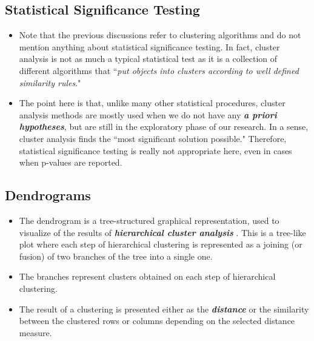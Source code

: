 \documentclass[a4paper,12pt]{article}
\begin{document}
\subsection{Statistical Significance Testing}

\begin{itemize}
\item Note that the previous discussions refer to clustering algorithms and do not mention anything about statistical significance testing. In fact, cluster analysis is not as much a typical statistical test as it is a collection of different algorithms that ``\textit{put objects into clusters according to well defined similarity rules}."
	
\item The point here is that, unlike many other statistical procedures, cluster analysis methods are mostly used when we do not have any \textbf{\textit{a priori hypotheses}}, but are still in the exploratory phase of our research. In a sense, cluster analysis finds the ``most significant solution possible." Therefore, statistical significance testing is really not appropriate here, even in cases when p-values are reported.
\end{itemize}


\subsection{Dendrograms}
\begin{itemize}
	
\item The dendrogram is a tree-structured graphical representation, used to visualize of the results of \textbf{\textit{hierarchical cluster analysis}} . This is a tree-like plot where each step of hierarchical clustering is represented as a joining (or fusion) of two branches of the tree into a single one. 
\item The branches represent clusters obtained on each step of hierarchical clustering. 
\item The result of a clustering is presented either as the \textbf{\textit{distance}} or the similarity between the clustered rows or columns depending on the selected distance measure.
\end{itemize}


%
%
\end{document}
